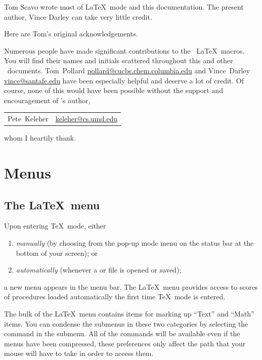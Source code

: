 \documentclass{report}
\begin{document}
Tom Scavo wrote most of \LaTeX\ mode and this documentation.  The 
present author, Vince Darley can take very little credit.

Here are Tom's original acknowledgements.

Numerous people have made significant contributions to the \Alpha\ 
\LaTeX\ macros.  You will find their names and initials scattered 
throughout this and other \Alpha\ documents.  
Tom~Pollard 
\href{mailto:pollard@cucbs.chem.columbia.edu}{pollard@cucbs.chem.columbia.edu}
and Vince~Darley 
\href{mailto:vince@santafe.edu}{vince@santafe.edu}
have been especially helpful and deserve a lot of credit.  Of course, 
none of this would have been possible without the support and 
encouragement of \Alpha's author,
\begin{flushleft}
    \begin{tabular}{@{\hspace{1.5em}}ll@{}}
        Pete~Keleher 
        & 
        \href{mailto:keleher@cs.umd.edu}{keleher@cs.umd.edu}
    \end{tabular}
\end{flushleft}
whom I heartily thank.

\chapter{Menus}

\section{The \LaTeX\ menu}

Upon entering \TeX\ mode, either 
\begin{enumerate}
	\item \emph{manually} (by choosing  from the pop-up mode 
	menu on the status bar at the bottom of your screen); or

	\item \emph{automatically} (whenever a  or 
	 file is opened or saved);
\end{enumerate}
a new menu appears in the menu bar.  The \LaTeX\ menu provides access 
to scores of procedures loaded automatically the first time \TeX\ mode 
is entered.

The bulk of the \LaTeX\ menu contains items for marking up ``Text'' and
``Math'' items.  You can condense the submenus in these two categories by
selecting the \acmd{Compress Text/Math Menus} command in the 
submenu.  All of the commands will be available even if the menus have been 
compressed, these preferences only affect the path that your mouse will have 
to take in order to access them.
\label{pg:compressMenus}
\end{document}
